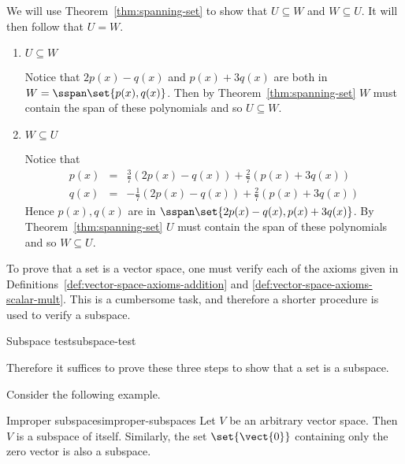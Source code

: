 \begin{solution}
  We will use Theorem~\ref{thm:spanning-set} to show that
  $U \subseteq W$ and $W \subseteq U$. It will then follow that $U=W$.
  \begin{enumerate}
  \item $U \subseteq W$

    Notice that $2p(x) - q(x)$ and $p(x) + 3q(x)$ are both in
    $W = \sspan \set{p(x), q(x) }$. Then by
    Theorem~\ref{thm:spanning-set} $W$ must contain the span of these
    polynomials and so $U \subseteq W$.

  \item $W \subseteq U$

    Notice that
    \begin{eqnarray*}
      p(x) &=& \frac{3}{7} (2p(x) - q(x))  + \frac{2}{7} (p(x) + 3q(x)) \\
      q(x) &=& -\frac{1}{7} (2p(x) - q(x))  + \frac{2}{7} (p(x) + 3q(x))
    \end{eqnarray*}
    Hence $p(x), q(x)$ are in
    $\sspan \set{2p(x) - q(x), p(x) + 3q(x) }$. By
    Theorem~\ref{thm:spanning-set} $U$ must contain the span of these
    polynomials and so $W \subseteq U$.
  \end{enumerate}
\end{solution}

To prove that a set is a vector space, one must verify each of the
axioms given in Definitions~\ref{def:vector-space-axioms-addition} and
{\ref{def:vector-space-axioms-scalar-mult}}. This is a cumbersome
task, and therefore a shorter procedure is used to verify a subspace.

\begin{procedure}{Subspace test}{subspace-test}
\end{procedure}

Therefore it suffices to prove these three steps to show that a set is
a subspace.

Consider the following example.

\begin{example}{Improper subspaces}{improper-subspaces}
  Let $V$ be an arbitrary vector space. Then $V$ is a subspace of
  itself. Similarly, the set $\set{\vect{0} }$ containing only the
  zero vector is also a subspace.
\end{example}

